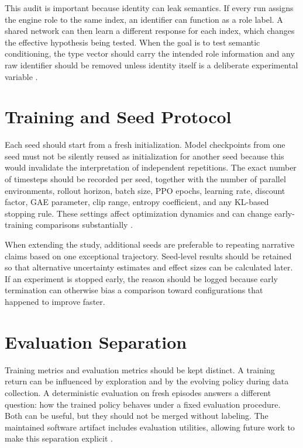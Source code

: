 \documentclass{iutbscthesis}
\begin{document}
\begin{appendices}
This audit is important because identity can leak semantics. If every run assigns the engine role to the same index, an identifier can function as a role label. A shared network can then learn a different response for each index, which changes the effective hypothesis being tested. When the goal is to test semantic conditioning, the type vector should carry the intended role information and any raw identifier should be removed unless identity itself is a deliberate experimental variable \parencite{terry2020revisiting}.

\section{Training and Seed Protocol}
Each seed should start from a fresh initialization. Model checkpoints from one seed must not be silently reused as initialization for another seed because this would invalidate the interpretation of independent repetitions. The exact number of timesteps should be recorded per seed, together with the number of parallel environments, rollout horizon, batch size, PPO epochs, learning rate, discount factor, GAE parameter, clip range, entropy coefficient, and any KL-based stopping rule. These settings affect optimization dynamics and can change early-training comparisons substantially \parencite{raffin2021sb3}.

When extending the study, additional seeds are preferable to repeating narrative claims based on one exceptional trajectory. Seed-level results should be retained so that alternative uncertainty estimates and effect sizes can be calculated later. If an experiment is stopped early, the reason should be logged because early termination can otherwise bias a comparison toward configurations that happened to improve faster.

\section{Evaluation Separation}
Training metrics and evaluation metrics should be kept distinct. A training return can be influenced by exploration and by the evolving policy during data collection. A deterministic evaluation on fresh episodes answers a different question: how the trained policy behaves under a fixed evaluation procedure. Both can be useful, but they should not be merged without labeling. The maintained software artifact includes evaluation utilities, allowing future work to make this separation explicit \parencite{ma_reles_ota_repo}.


\end{appendices}
\end{document}
